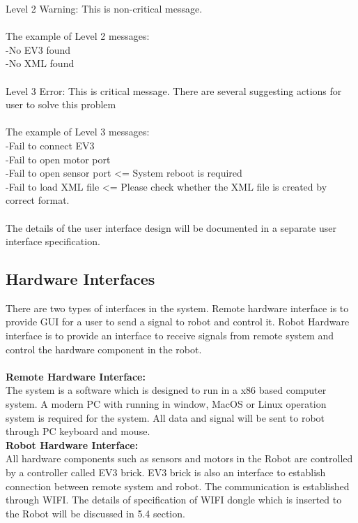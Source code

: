 \documentclass[10pt,a4paper,titlepage]{article}
\begin{document}
Level 2 Warning: This is non-critical message.\\\\
The example of Level 2 messages:\\
-No EV3 found\\
-No XML found\\\\

Level 3 Error: This is critical message. There are several suggesting actions for user to solve this problem\\\\
The example of Level 3 messages:\\
-Fail to connect EV3\\
-Fail to open motor port\\
-Fail to open sensor port <= System reboot is required\\
-Fail to load XML file <= Please check whether the XML file is created by correct format.\\\\

The details of the user interface design will be documented in a separate user interface specification.



\subsection{Hardware Interfaces}

There are two types of interfaces in the system. Remote hardware interface is to provide GUI for a user to send a signal to robot and control it. Robot Hardware interface is to provide an interface to receive signals from remote system and control the hardware component in the robot.\\\\

\textbf{Remote Hardware Interface:}\\

The system is a software which is designed to run in a x86 based computer system. A modern PC with running in window, MacOS or Linux operation system is required for the system. All data and signal will be sent to robot through PC keyboard and mouse.\\

\textbf{Robot Hardware Interface:}\\

All hardware components such as sensors and motors in the Robot are controlled by a controller called EV3 brick. EV3 brick is also an interface to establish connection between remote system and robot. The communication is established through WIFI. The details of specification of WIFI dongle which is inserted to the Robot will be discussed in 5.4 section.\\
\end{document}

